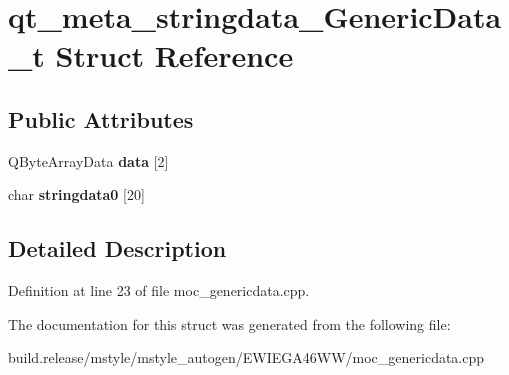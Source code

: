 \hypertarget{structqt__meta__stringdata___generic_data__t}{}\section{qt\+\_\+meta\+\_\+stringdata\+\_\+\+Generic\+Data\+\_\+t Struct Reference}
\label{structqt__meta__stringdata___generic_data__t}
\subsection*{Public Attributes}
\begin{DoxyCompactItemize}
\item 
\mbox{\label{structqt__meta__stringdata___generic_data__t_af1d6e6c910ae4ce2774cce2c6039c92e}} 
Q\+Byte\+Array\+Data {\bfseries data} \mbox{[}2\mbox{]}
\item 
\mbox{\label{structqt__meta__stringdata___generic_data__t_adb45482a859bf1f53c047e8e17302833}} 
char {\bfseries stringdata0} \mbox{[}20\mbox{]}
\end{DoxyCompactItemize}


\subsection{Detailed Description}


Definition at line 23 of file moc\+\_\+genericdata.\+cpp.



The documentation for this struct was generated from the following file\+:\begin{DoxyCompactItemize}
\item 
build.\+release/mstyle/mstyle\+\_\+autogen/\+E\+W\+I\+E\+G\+A46\+W\+W/moc\+\_\+genericdata.\+cpp\end{DoxyCompactItemize}
